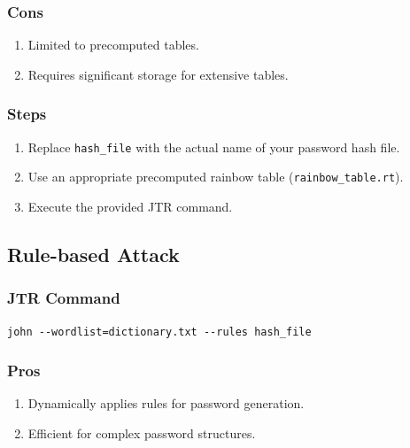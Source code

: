 \documentclass[11pt]{article}
\begin{document}
\subsubsection{Cons}

\begin{enumerate}
    \item Limited to precomputed tables.
    \item Requires significant storage for extensive tables.
\end{enumerate}

\subsubsection{Steps}

\begin{enumerate}
    \item Replace \texttt{hash\_file} with the actual name of your password hash file.
    \item Use an appropriate precomputed rainbow table (\texttt{rainbow\_table.rt}).
    \item Execute the provided JTR command.
\end{enumerate}




\subsection{Rule-based Attack}

\subsubsection{JTR Command}

\begin{verbatim}
john --wordlist=dictionary.txt --rules hash_file
\end{verbatim}

\subsubsection{Pros}

\begin{enumerate}
    \item Dynamically applies rules for password generation.
    \item Efficient for complex password structures.
\end{enumerate}
\end{document}
